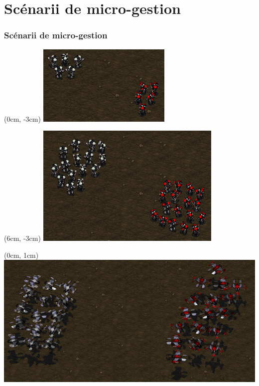 \documentclass[smaller]{beamer}
\begin{document}

\section{Scénarii de micro-gestion}

\begin{frame}
  \frametitle{Scénarii de micro-gestion}

  \begin{textblock*}{5cm}(0cm, -3cm)
    \includegraphics[width=\linewidth]{./figs/starcraft_m5v5}
  \end{textblock*}

  \begin{textblock*}{5cm}(6cm, -3cm)
    \includegraphics[width=0.9\linewidth]{./figs/starcraft_m15v16}
  \end{textblock*}

  \begin{textblock*}{5cm}(0cm, 1cm)
    \includegraphics[width=\linewidth]{./figs/starcraft_w15v17}
  \end{textblock*}


\end{frame}
\end{document}
